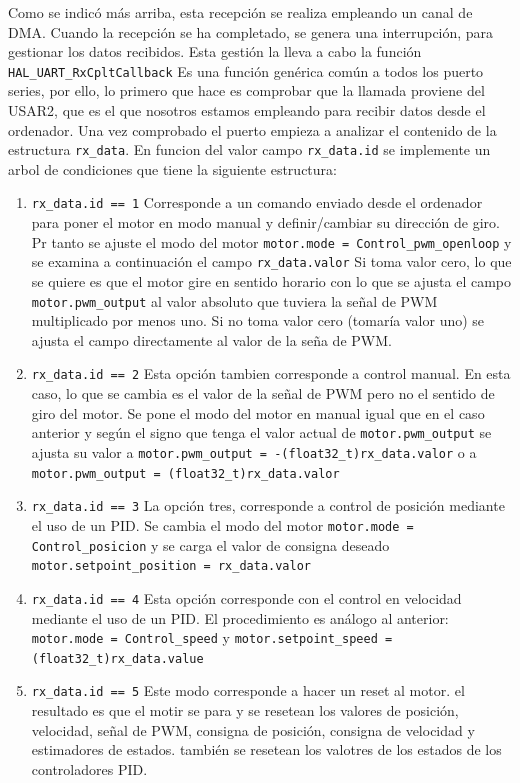 Como se indicó más arriba, esta recepción se realiza empleando un canal de DMA. Cuando la recepción se ha completado, se genera una interrupción, para gestionar los datos recibidos. Esta gestión la lleva a cabo la función \texttt{HAL\_UART\_RxCpltCallback}
Es una función genérica común a todos los puerto series, por ello, lo primero que hace es comprobar que la llamada proviene del USAR2, que es el que nosotros estamos empleando para recibir datos desde el ordenador. Una vez comprobado el puerto empieza a  analizar el contenido de la estructura \texttt{rx\_data}. En funcion del valor campo \texttt{rx\_data.id} se implemente un arbol de condiciones que tiene la siguiente estructura:
\begin{enumerate}
    \item \texttt{rx\_data.id == 1} Corresponde a un comando enviado desde el ordenador para poner el motor en modo manual y definir/cambiar su dirección de giro. Pr tanto se ajuste el modo del motor \texttt{motor.mode = Control\_pwm\_openloop} y se examina a continuación el campo \texttt{rx\_data.valor} Si toma valor cero, lo que se quiere es que el motor gire en sentido horario con lo que se ajusta el campo \texttt{motor.pwm\_output} al valor absoluto que tuviera la señal de PWM multiplicado por menos uno. Si no toma valor cero (tomaría valor uno) se ajusta el campo directamente al valor de la seña de PWM.
    \item \texttt{rx\_data.id == 2} Esta opción tambien corresponde a control manual. En esta caso, lo que se cambia es el valor de la señal de PWM pero no el sentido de giro del motor. Se pone el modo del motor en manual igual que en el caso anterior y según el signo que tenga el valor actual de \texttt{motor.pwm\_output} se ajusta su valor a \texttt{motor.pwm\_output = -(float32\_t)rx\_data.valor} o a \texttt{motor.pwm\_output = (float32\_t)rx\_data.valor}
    \item \texttt{rx\_data.id == 3} La opción tres, corresponde a control de posición mediante el uso de un PID. Se cambia el modo del motor \texttt{motor.mode = Control\_posicion} y se carga el valor de consigna deseado \texttt{motor.setpoint\_position = rx\_data.valor}
    \item \texttt{rx\_data.id == 4} Esta opción corresponde con el control en velocidad mediante el uso de un PID. El procedimiento es análogo al anterior: \texttt{motor.mode = Control\_speed} y \texttt{motor.setpoint\_speed = (float32\_t)rx\_data.value}
    \item \texttt{rx\_data.id == 5} Este modo corresponde a hacer un reset al motor. el resultado es que el motir se para y se resetean los valores de posición, velocidad, señal de PWM, consigna de posición, consigna de velocidad y estimadores de estados. también se resetean los valotres de los estados de los controladores PID.

\end{enumerate}
